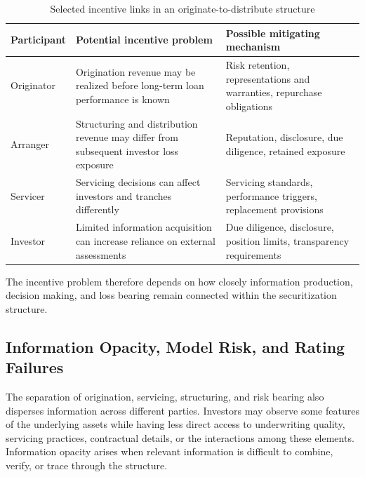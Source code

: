 \begin{table}[H]

\centering

\caption{Selected incentive links in an originate-to-distribute structure}

\label{tab:ch20-otd-incentives}

\begin{tabularx}{\textwidth}{@{}p{3.4cm}YY@{}}

\toprule
\textbf{Participant} &
\textbf{Potential incentive problem} &
\textbf{Possible mitigating mechanism} \\
\midrule

Originator &
Origination revenue may be realized before long-term loan performance is known &
Risk retention, representations and warranties, repurchase obligations \\

Arranger &
Structuring and distribution revenue may differ from subsequent investor loss exposure &
Reputation, disclosure, due diligence, retained exposure \\

Servicer &
Servicing decisions can affect investors and tranches differently &
Servicing standards, performance triggers, replacement provisions \\

Investor &
Limited information acquisition can increase reliance on external assessments &
Due diligence, disclosure, position limits, transparency requirements \\

\bottomrule

\end{tabularx}

\end{table}

The incentive problem therefore depends on how closely information production, decision making, and loss bearing remain connected within the securitization structure.


\subsection[Information Opacity, Model Risk, and Rating Failures]{Information Opacity, Model Risk, and Rating Failures}

The separation of origination, servicing, structuring, and risk bearing also disperses information across different parties. Investors may observe some features of the underlying assets while having less direct access to underwriting quality, servicing practices, contractual details, or the interactions among these elements. Information opacity arises when relevant information is difficult to combine, verify, or trace through the structure.

